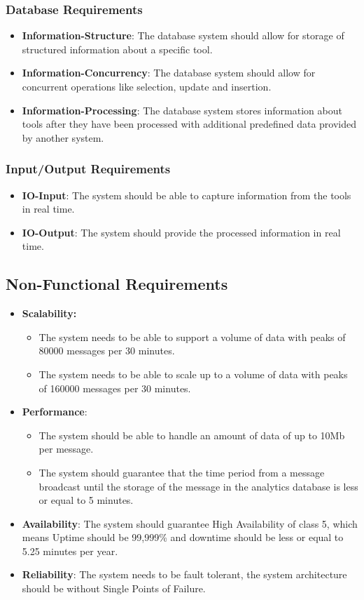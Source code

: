 \subsubsection{Database Requirements}
\begin{itemize}
    \item \textbf{Information-Structure}: The database system should allow for storage of structured information about a specific tool.
    \item \textbf{Information-Concurrency}: The database system should allow for concurrent operations like selection, update and insertion.
    \item \textbf{Information-Processing}: The database system stores information about tools after they have been processed with additional predefined data provided by another system.
\end{itemize}

\subsubsection{Input/Output Requirements}
\begin{itemize}
    \item \textbf{IO-Input}: The system should be able to capture information from the tools in real time.
    \item \textbf{IO-Output}: The system should provide the processed information in real time.
\end{itemize}
\newpage
\subsection{Non-Functional Requirements}
\begin{itemize}
    \item \textbf{Scalability:} \begin{itemize}
        \item The system needs to be able to support a volume of data with peaks of 80000 messages per 30 minutes.
        \item The system needs to be able to scale up to a volume of data with peaks of 160000 messages per 30 minutes.
    \end{itemize}
    \item \textbf{Performance}: \begin{itemize}
        \item The system should be able to handle an amount of data of up to 10Mb per message.
        \item The system should guarantee that the time period from a message broadcast until the storage of the message in the analytics database is less or equal to 5 minutes.
    \end{itemize}
    \item \textbf{Availability}: The system should guarantee High Availability of class 5, which means Uptime should be 99,999\% and downtime should be less or equal to 5.25 minutes per year.
    \item \textbf{Reliability}: The system needs to be fault tolerant, the system architecture should be without Single Points of Failure.
\end{itemize}

